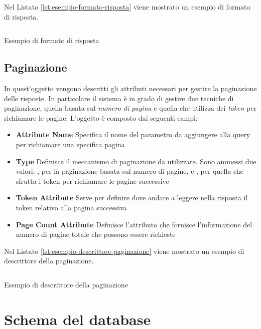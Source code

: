 Nel Listato \ref{lst:esempio-formato-risposta} viene mostrato un esempio di formato di risposta.

\begin{listing}[H]
	\inputminted{json}{5-implementazione-backend/Codice/esempio_formato_risposta.json}
	\caption{Esempio di formato di risposta}
	\label{lst:esempio-formato-risposta}
\end{listing}

\subsection{Paginazione\label{sec:descrittore-paginazione}}

In quest'oggetto vengono descritti gli attributi necessari per gestire la paginazione delle risposte. In particolare il sistema è in grado di gestire due tecniche di paginazione, quella basata sul \emph{numero di pagina} e quella che utilizza dei \emph{token} per richiamare le pagine. L'oggetto è composto dai seguenti campi:

\begin{itemize}
	\item \textbf{Attribute Name}
	Specifica il nome del parametro da aggiungere alla query per richiamare una specifica pagina
	\item \textbf{Type}
	Definisce il meccanismo di paginazione da utilizzare. Sono ammessi due valori: , per la paginazione basata sul numero di pagine, e , per quella che sfrutta i token per richiamare le pagine successive
	\item \textbf{Token Attribute}
	Serve per definire dove andare a leggere nella risposta il token relativo alla pagina successiva
	\item \textbf{Page Count Attribute}
	Definisce l'attributo che fornisce l'informazione del numero di pagine totale che possono essere richieste
\end{itemize}

Nel Listato \ref{lst:esempio-descrittore-paginazione} viene mostrato un esempio di descrittore della paginazione.

\begin{listing}[H]
	\inputminted{json}{5-implementazione-backend/Codice/esempio_descrittore_paginazione.json}
	\caption{Esempio di descrittore della paginazione}
	\label{lst:esempio-descrittore-paginazione}
\end{listing}

\section{Schema del database\label{sec:schema-database}}

